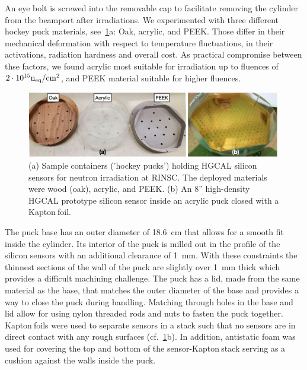 An eye bolt is screwed into the removable cap to facilitate removing the cylinder from the beamport after irradiations.
We experimented with three different hockey puck materials, see~\ref{fig:Pucks_Arrayed}a: Oak, acrylic, and PEEK. 
Those differ in their mechanical deformation with respect to temperature fluctuations, in their activations, radiation hardness and overall cost.
As practical compromise between thse factors, we found acrylic most suitable for irradiation up to fluences of $2\cdot 10^{15}\mathrm{n_{eq}}/\mathrm{cm}^{2}$, and PEEK material suitable for higher fluences. 
\begin{figure}[!hbt]
  \begin{center}
    \includegraphics[width=0.99\textwidth]{figures/figures_edited_002.jpeg}
    \caption{(a) Sample containers ('hockey pucks') holding HGCAL silicon sensors for neutron irradiation at RINSC. 
    The deployed materials were wood (oak), acrylic, and PEEK.
    (b) An 8'' high-density HGCAL prototype silicon sensor inside an acrylic puck closed with a Kapton\texttrademark$~$foil.}
    \label{fig:Pucks_Arrayed}
  \end{center}
\end{figure}
The puck base has an outer diameter of \SI{18.6}{\centi\metre} that allows for a smooth fit inside the cylinder. 
Its interior of the puck is milled out in the profile of the silicon sensors with an additional clearance of \SI{1}{\milli\metre}. 
With these constraints the thinnest sections of the wall of the puck are slightly over \SI{1}{\milli\metre} thick which provides a difficult machining challenge.
The puck has a lid, made from the same material as the base, that matches the outer diameter of the base and provides a way to close the puck during handling.
Matching through holes in the base and lid allow for using nylon threaded rods and nuts to fasten the puck together. 
Kapton\texttrademark$~$foils were used to separate sensors in a stack such that no sensors are in direct contact with any rough surfaces (cf.~\ref{fig:Pucks_Arrayed}b).
In addition, antistatic foam was used for covering the top and bottom of the sensor-Kapton\texttrademark$~$stack serving as a cushion  against the walls inside the puck.
